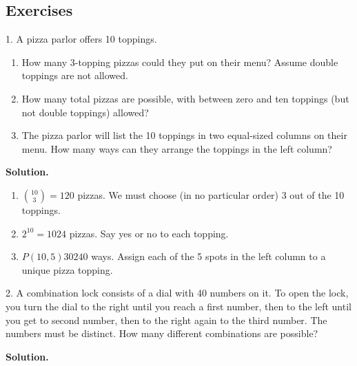 \documentclass[10pt,]{book}
\theoremstyle{plain}
\theoremstyle{definition}
\theoremstyle{definition}
\theoremstyle{definition}
\numberwithin{equation}{section}
\begin{document}
\subsection[Exercises]{Exercises}\label{exercises-6}
\begin{exerciselist}
\item[1.]\hypertarget{exercise-60}{}
                A pizza parlor offers 10 toppings.
\leavevmode%
\begin{enumerate}[label=(\alph*)]
\item\hypertarget{li-466}{} How many 3-topping pizzas could they put on their menu?  Assume double toppings are not allowed. %
\item\hypertarget{li-467}{} How many total pizzas are possible, with between zero and ten toppings (but not double toppings) allowed? %
\item\hypertarget{li-468}{} The pizza parlor will list the 10 toppings in two equal-sized columns on their menu.  How many ways can they arrange the toppings in the left column? %
\end{enumerate}
\par\smallskip
\par\smallskip
\noindent\textbf{Solution.}\hypertarget{solution-91}{}\quad
\leavevmode%
\begin{enumerate}[label=(\alph*)]
\item\hypertarget{li-469}{}\({10 \choose 3} = 120\) pizzas.  We must choose (in no particular order) 3 out of the 10 toppings.%
\item\hypertarget{li-470}{}\(2^{10} = 1024\) pizzas.  Say yes or no to each topping.%
\item\hypertarget{li-471}{}\(P(10,5) 30240\) ways.  Assign each of the 5 spots in the left column to a unique pizza topping.%
\end{enumerate}
\item[2.]\hypertarget{exercise-61}{}
                A combination lock consists of a dial with 40 numbers on it. To open the lock, you turn the dial to the right until you reach a first number, then to the left until you get to second number, then to the right again to the third number. The numbers must be distinct. How many different combinations are possible?
\par\smallskip
\par\smallskip
\noindent\textbf{Solution.}\hypertarget{solution-92}{}\quad


\end{exerciselist}
\end{document}
